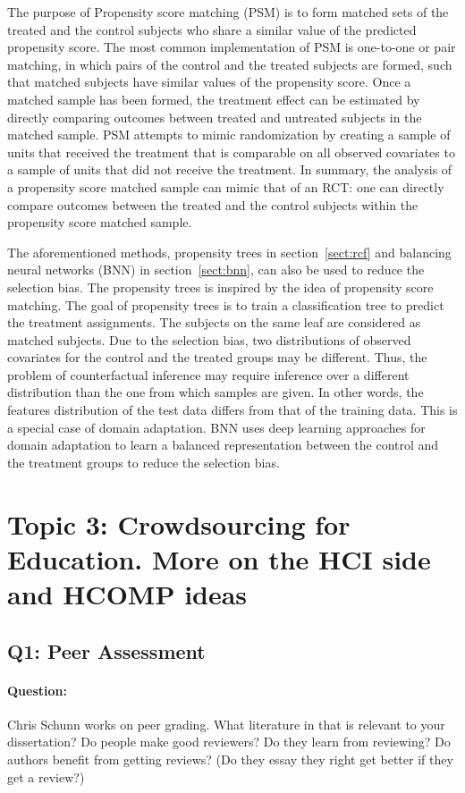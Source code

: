 \documentclass{article}
\begin{document}
The purpose of Propensity score matching (PSM) \cite{austin2011introduction} is to form matched sets
of the treated and
the control subjects who share a similar value of the predicted propensity
score. The most common
implementation of PSM is one-to-one or pair matching, in which pairs
of the control and the treated subjects are formed, such that matched
subjects have similar values of the propensity score. Once a matched
sample has been formed, the treatment effect can be estimated by
directly comparing outcomes between treated and untreated subjects in
the matched sample. PSM attempts to mimic randomization by creating a
sample of units that received the treatment that is comparable on all
observed covariates to a sample of units that did not receive the
treatment. In summary, the analysis of a propensity score matched sample can mimic that of an
RCT: one can directly compare outcomes between the treated and the control
subjects within the propensity score matched sample. 

The aforementioned methods, propensity trees
\cite{wager2015estimation} in section~\ref{sect:rcf} and balancing
neural networks (BNN) \cite{Johansson2016-dh} in
section~\ref{sect:bnn}, can also be used to reduce the selection
bias. The propensity trees is inspired by the idea of propensity score
matching. The goal of propensity trees is to train a classification
tree to predict the treatment assignments. The subjects on the same
leaf are considered as matched subjects. Due to the selection bias,
two distributions of observed covariates for the control and the
treated groups may be different. Thus, the problem of counterfactual
inference may require inference over a different distribution than the
one from which samples are given. In other words, the features
distribution of the test data differs from that of the training
data. This is a special case of domain adaptation. BNN uses deep learning
approaches for domain adaptation to learn a balanced representation
between the control and the treatment groups to reduce the selection
bias.

\section{Topic 3: Crowdsourcing for Education.  More on the HCI side and HCOMP ideas}
\subsection{Q1: Peer Assessment}
\paragraph{Question:} Chris Schunn works on peer grading.  What
literature in that is relevant to your dissertation?  Do people make
good reviewers? Do they learn from reviewing?  Do authors benefit from
getting reviews?  (Do they essay they right get better if they get a
review?) \\ [0.1 in]
\end{document}
